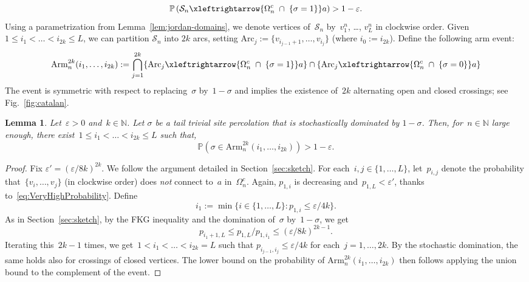 \documentclass[11pt,letterpaper]{amsart}
\newcounter{n}
\numberwithin{n}{section}
\theoremstyle{plain}
\newtheorem{lemma}[n]{Lemma}
\theoremstyle{definition}
\theoremstyle{remark}
\newcommand\eps\varepsilon
\renewcommand\P{\mathbb P}
\newcommand\N{\mathbb N}
\newcommand\calS{\mathcal S}
\newcommand\domain\Omega
\newcommand{\1}{\mathbbm{1}}
\begin{document}
\begin{equation}\label{eq:VeryHighProbability}
\mathbb{P}\left(\calS_n   \xleftrightarrow{\domain_n^c \; \cap \; \{\sigma=1\}} a \right) > 1- \eps.
\end{equation}
 Using a parametrization from Lemma~\ref{lem:jordan-domains}, we denote vertices of~$\calS_n $ by~$v_1^n$, \dots, $v_L^n$ in clockwise order.
Given $1 \leq i_1 < \dots < i_{2k} \leq L$, we can partition $\calS_n$ into $2k$ arcs, setting $\mathrm{Arc}_j := \{v_{i_{j-1} +1}, \dots, v_{i_{j}}\}$ (where $i_0 := i_{2k}$).
Define the following arm event:
\[
\mathrm{Arm}_{n}^{2k}(i_1, \dots, i_{2k}) := \bigcap_{j=1}^{2k} \{\mathrm{Arc}_j\xleftrightarrow{\domain_n^c \; \cap \; \{\sigma=1\}} a\} \cap \{\mathrm{Arc}_j \xleftrightarrow{\domain_n^c \; \cap \; \{\sigma=0\}} a\}
\]   
The event is symmetric with respect to replacing~$\sigma$ by~$1-\sigma$ and implies the existence of~$2k$ alternating open and closed crossings; see Fig.~\ref{fig:catalan}.

\begin{lemma}\label{lem:crossings}
	Let~$\varepsilon>0$ and~$k\in \N$. Let $\sigma$ be a tail trivial site percolation that is stochastically dominated by $1 - \sigma$. Then, for~$n\in\N$ large enough, there exist~$1\leq i_1<\dots<i_{2k}\leq L$ such that,
	\[
		\P(\sigma\in \mathrm{Arm}_n^{2k}(i_1,\dots,i_{2k})) > 1-\varepsilon.
	\]

\end{lemma}

\begin{proof}
	Fix $\eps' = (\eps/8k)^{2k}$. We follow the argument detailed in Section~\ref{sec:sketch}. For each~$i,j\in \{1,\dots,L\}$, let~$p_{i,j}$ denote the probability that~$\{v_i,\dots,v_j\}$ (in clockwise order) does {\em not} connect to~$a$ in~$\domain_n^c$.
	Again, $p_{1,i}$ is decreasing and~$p_{1,L}< \eps'$, thanks to~\eqref{eq:VeryHighProbability}.
	Define
	\[
		i_1:=\min\{i\in \{1,\dots,L\}\colon p_{1,i} \leq \eps/4k\}.
	\]
	As in Section~\ref{sec:sketch}, by the FKG inequality and the domination of~$\sigma$ by~$1-\sigma$, we get
	\[
		p_{i_1+1,L} \leq p_{1,L}/p_{1,i_1} \leq (\eps/8k)^{2k-1}.
	\]
	Iterating this~$2k-1$ times, we get~$1<i_1<\dots<i_{2k}=L$ such that $p_{i_{j-1},i_j} \leq \eps/4k$ for each~$j=1,\dots, 2k$.
	By the stochastic domination, the same holds also for crossings of closed vertices.
	The lower bound on the probability of $\mathrm{Arm}_n^{2k}(i_1,\dots,i_{2k})$ then follows applying the union bound to the complement of the event.
\end{proof}
\end{document}
